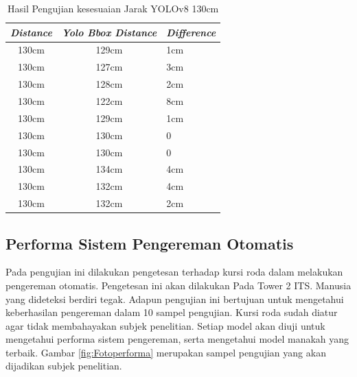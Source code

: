       \begin{table}[H]
        \centering
        \caption{Hasil Pengujian kesesuaian Jarak YOLOv8 130cm}
        \label{tb:pengukurankesusaian130cmv8}
        \begin{tabular}{|c|c|l|}
          \hline
          \textit{Distance} & \textit{Yolo Bbox Distance} & \textit{Difference} \\ \hline
          130cm             & 129cm                       & 1cm                 \\ \hline
          130cm             & 127cm                       & 3cm                 \\ \hline
          130cm             & 128cm                       & 2cm                 \\ \hline
          130cm             & 122cm                       & 8cm                 \\ \hline
          130cm             & 129cm                       & 1cm                 \\ \hline
          130cm             & 130cm                       & 0                   \\ \hline
          130cm             & 130cm                       & 0                   \\ \hline
          130cm             & 134cm                       & 4cm                 \\ \hline
          130cm             & 132cm                       & 4cm                 \\ \hline
          130cm             & 132cm                       & 2cm                 \\ \hline
          \end{tabular}
        \end{table}

\newpage
\subsection{Performa Sistem Pengereman Otomatis}

Pada pengujian ini dilakukan pengetesan terhadap kursi roda dalam melakukan pengereman otomatis. Pengetesan ini akan dilakukan Pada Tower 2 ITS. Manusia yang dideteksi berdiri tegak. Adapun pengujian ini bertujuan untuk mengetahui keberhasilan pengereman dalam 10 sampel pengujian. Kursi roda sudah diatur agar tidak membahayakan subjek penelitian. Setiap model akan diuji untuk mengetahui performa sistem pengereman, serta mengetahui model manakah yang terbaik. Gambar \ref{fig:Fotoperforma} merupakan sampel pengujian yang akan dijadikan subjek penelitian.

